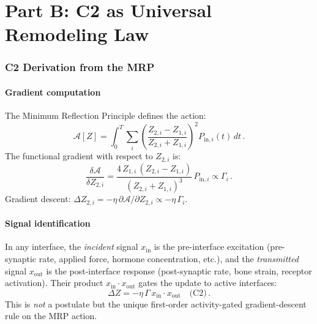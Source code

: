 \documentclass[aps,pre,twocolumn,superscriptaddress,floatfix]{revtex4-2}
\begin{document}
\part*{Part B: C2 as Universal Remodeling Law}


\section{C2 Derivation from the MRP}
\label{sec:c2-derivation}

\subsection{Gradient computation}

The Minimum Reflection Principle defines the action:
\begin{equation}
  \mathcal{A}[Z] = \int_0^T \sum_i
  \left(\frac{Z_{2,i} - Z_{1,i}}{Z_{2,i} + Z_{1,i}}\right)^2
  P_{\text{in},i}(t)\,dt\,.
\end{equation}
The functional gradient with respect to $Z_{2,i}$ is:
\begin{equation}
  \frac{\delta\mathcal{A}}{\delta Z_{2,i}}
  = \frac{4\,Z_{1,i}\,(Z_{2,i}-Z_{1,i})}
         {(Z_{2,i}+Z_{1,i})^3}\,P_{\text{in},i}
  \propto \Gamma_i\,.
  \label{eq:gradient}
\end{equation}
Gradient descent:
$\Delta Z_{2,i} = -\eta\,\partial\mathcal{A}/\partial Z_{2,i}
\propto -\eta\,\Gamma_i$.

\subsection{Signal identification}

In any interface, the \emph{incident} signal
$x_{\text{in}}$ is the pre-interface excitation
(pre-synaptic rate, applied force, hormone concentration,
etc.), and the \emph{transmitted} signal
$x_{\text{out}}$ is the post-interface response
(post-synaptic rate, bone strain, receptor activation).
Their product $x_{\text{in}} \cdot x_{\text{out}}$
gates the update to active interfaces:
\begin{equation}
  \boxed{
  \Delta Z = -\eta\,\Gamma\,
  x_{\text{in}} \cdot x_{\text{out}}
  }
  \quad\text{(C2)}\,.
  \label{eq:C2-derived}
\end{equation}
This is \emph{not} a postulate but the unique first-order
activity-gated gradient-descent rule on the MRP action.
\end{document}
